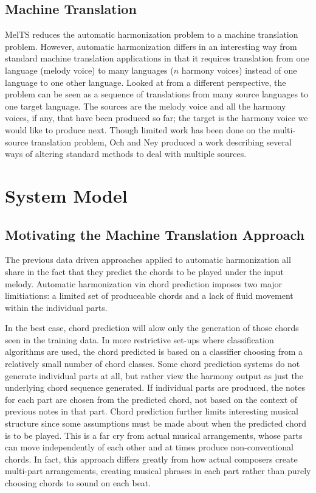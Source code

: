\documentclass{sig-alternate}
\begin{document}
\subsection{Machine Translation}
MelTS reduces the automatic harmonization problem to a machine translation problem. However, automatic harmonization differs in an interesting way from standard machine translation applications in that it requires translation from one language (melody voice) to many languages ($n$ harmony voices) instead of one language to one other language. Looked at from a different perspective, the problem can be seen as a sequence of translations from many source languages to one target language. The sources are the melody voice and all the harmony voices, if any, that have been produced so far; the target is the harmony voice we would like to produce next. Though limited work has been done on the multi-source translation problem, Och and Ney \cite{franzjosefochhermannney2001} produced a work describing several ways of altering standard methods to deal with multiple sources.

\section{System Model}
\label{sec:sys_model}
\subsection{Motivating the Machine Translation Approach}

The previous data driven approaches applied to automatic harmonization all share in the fact that they predict the chords to be played under the input melody. Automatic harmonization via chord prediction imposes two major limitiations: a limited set of produceable chords and a lack of fluid movement within the individual parts. 

In the best case, chord prediction will alow only the generation of those chords seen in the training data. In more restrictive set-ups where classification algorithms are used, the chord predicted is based on a classifier choosing from a relatively small number of chord classes. Some chord prediction systems do not generate individual parts at all, but rather view the harmony output as just the underlying chord sequence generated. If individual parts are produced, the notes for each part are chosen from the predicted chord, not based on the context of previous notes in that part. Chord prediction further limits interesting musical structure since some assumptions must be made about when the predicted chord is to be played. This is a far cry from actual musical arrangements, whose parts can move independently of each other and at times produce non-conventional chords. In fact, this approach differs greatly from how actual composers create multi-part arrangements, creating musical phrases in each part rather than purely choosing chords to sound on each beat.
\end{document}
